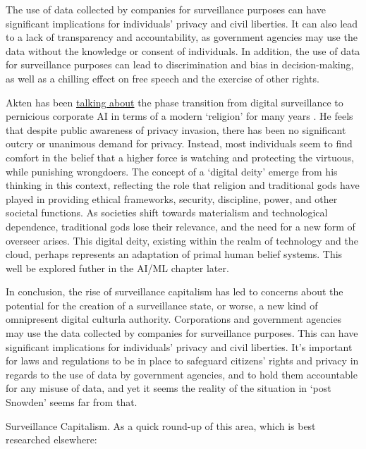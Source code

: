 The use of data collected by companies for surveillance purposes can have significant implications for individuals' privacy and civil liberties. It can also lead to a lack of transparency and accountability, as government agencies may use the data without the knowledge or consent of individuals. In addition, the use of data for surveillance purposes can lead to discrimination and bias in decision-making, as well as a chilling effect on free speech and the exercise of other rights.\par
Akten has been \href{https://memoakten.medium.com/all-watched-over-by-machines-of-loving-grace-8c2464aa6fda}{talking about} the phase transition from digital surveillance to pernicious corporate AI in terms of a modern `religion' for many years \cite{bayer2023artificial}. He feels that despite public awareness of privacy invasion, there has been no significant outcry or unanimous demand for privacy. Instead, most individuals seem to find comfort in the belief that a higher force is watching and protecting the virtuous, while punishing wrongdoers. The concept of a `digital deity' emerge from his thinking in this context, reflecting the role that religion and traditional gods have played in providing ethical frameworks, security, discipline, power, and other societal functions. As societies shift towards materialism and technological dependence, traditional gods lose their relevance, and the need for a new form of overseer arises. This digital deity, existing within the realm of technology and the cloud, perhaps represents an adaptation of primal human belief systems. This well be explored futher in the AI/ML chapter later.\par 
In conclusion, the rise of surveillance capitalism has led to concerns about the potential for the creation of a surveillance state, or worse, a new kind of omnipresent digital culturla authority. Corporations and government agencies may use the data collected by companies for surveillance purposes. This can have significant implications for individuals' privacy and civil liberties. It's important for laws and regulations to be in place to safeguard citizens' rights and privacy in regards to the use of data by government agencies, and to hold them accountable for any misuse of data, and yet it seems the reality of the situation in `post Snowden' seems far from that.\par 
Surveillance Capitalism. As a quick round-up of this area, which is best researched elsewhere:

